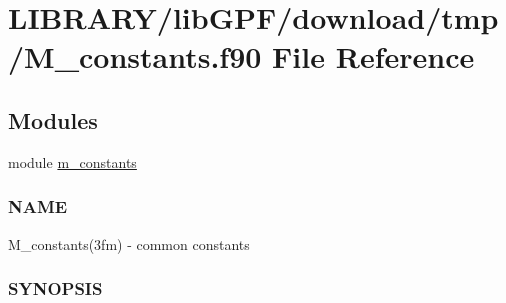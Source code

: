 \hypertarget{M__constants_8f90}{}\section{L\+I\+B\+R\+A\+R\+Y/lib\+G\+P\+F/download/tmp/\+M\+\_\+constants.f90 File Reference}
\label{M__constants_8f90}
\subsection*{Modules}
\begin{DoxyCompactItemize}
\item 
module \hyperlink{namespacem__constants}{m\+\_\+constants}
\begin{DoxyCompactList}\small\item\em \subsubsection*{N\+A\+ME}

M\+\_\+constants(3fm) -\/ common constants \subsubsection*{S\+Y\+N\+O\+P\+S\+IS}\end{DoxyCompactList}\end{DoxyCompactItemize}
